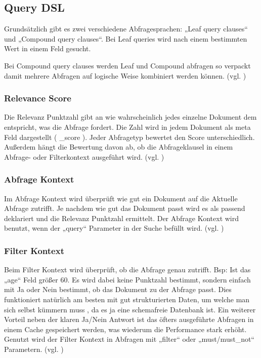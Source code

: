 \subsection{Query DSL}
Grundsätzlich gibt es zwei verschiedene Abfragesprachen: „Leaf query clauses“ und „Compound query clauses“.
Bei Leaf queries wird nach einem bestimmten Wert in einem Feld gesucht.


Bei Compound query clauses werden Leaf und Compound abfragen so verpackt damit mehrere Abfragen auf logische Weise kombiniert werden können.
(vgl. \cite{ESQueryDsl}) 
\subsubsection{Relevance Score}
Die Relevanz Punktzahl gibt an wie wahrscheinlich jedes einzelne Dokument dem entspricht, was die Abfrage fordert. Die Zahl wird in jedem Dokument als meta Feld dargestellt ( \_score ). Jeder Abfragetyp bewertet den Score unterschiedlich. Außerdem hängt die Bewertung davon ab, ob die Abfrageklausel in einem Abfrage- oder Filterkontext ausgeführt wird. (vgl. \cite{DSLQueryFilter})
\subsubsection{Abfrage Kontext}
Im Abfrage Kontext wird überprüft wie gut ein Dokument auf die Aktuelle Abfrage zutrifft. Je nachdem wie gut das Dokument passt wird es als passend deklariert und die Relevanz Punktzahl ermittelt. Der Abfrage Kontext wird benutzt, wenn der „query“ Parameter in der Suche befüllt wird. (vgl. \cite{DSLQueryFilter})
\subsubsection{Filter Kontext}
Beim Filter Kontext wird überprüft, ob die Abfrage genau zutrifft. Bsp: Ist das „age“ Feld größer 60.
Es wird dabei keine Punktzahl bestimmt, sondern einfach mit Ja oder Nein bestimmt, ob das Dokument zu der Abfrage passt. Dies funktioniert natürlich am besten mit gut strukturierten Daten, um welche man sich selbst kümmern muss , da es ja eine schemafreie Datenbank ist. Ein weiterer Vorteil neben der klaren Ja/Nein Antwort ist das öfters ausgeführte Abfragen in einem Cache gespeichert werden, was wiederum die Performance stark erhöht.
Genutzt wird der Filter Kontext in Abfragen mit „filter“ oder „must/must\_not“ Parametern. (vgl. \cite{DSLQueryFilter})

